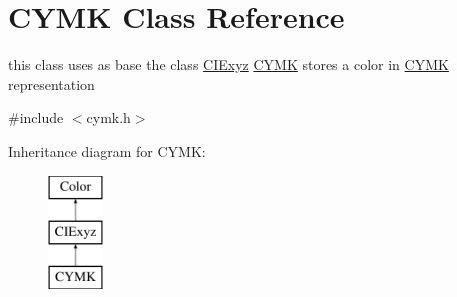 \hypertarget{class_c_y_m_k}{}\section{C\+Y\+MK Class Reference}
\label{class_c_y_m_k}


this class uses as base the class \hyperlink{class_c_i_exyz}{C\+I\+Exyz} \hyperlink{class_c_y_m_k}{C\+Y\+MK} stores a color in \hyperlink{class_c_y_m_k}{C\+Y\+MK} representation  




{\ttfamily \#include $<$cymk.\+h$>$}

Inheritance diagram for C\+Y\+MK\+:\begin{figure}[H]
\begin{center}
\leavevmode
\includegraphics[height=3.000000cm]{class_c_y_m_k}
\end{center}
\end{figure}
